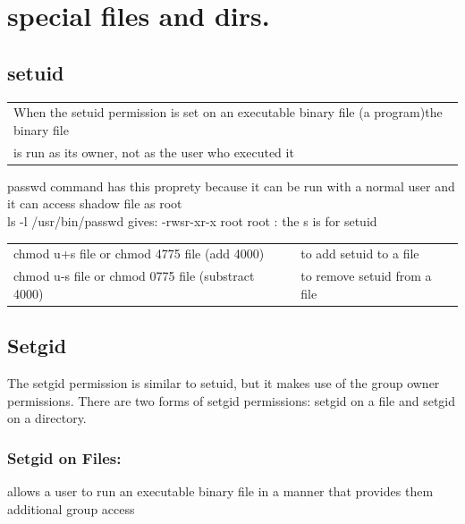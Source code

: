 \documentclass[10pt]{article}
\begin{document}
\section{special files and dirs.}
\subsection{setuid}
\begin{center}
	\begin{tabular}{|l|}
		\hline
		When the setuid permission is set on an executable binary file (a program)the binary file \\is run as its owner, not as the user who executed it\\
		\hline
	\end{tabular}
\end{center}
passwd command has this proprety because it can be run with a normal user and it can access shadow file as root\\
ls -l /usr/bin/passwd gives: -rwsr-xr-x root root : the s is for setuid\\
\begin{center}
	\begin{tabular}{l l}
		chmod u+s file or chmod 4775 file (add 4000)& to add setuid to a file\\
		chmod u-s file or chmod 0775 file (substract 4000)& to remove setuid from a file\\
	\end{tabular}
\end{center}
\subsection{Setgid}
The setgid permission is similar to setuid, but it makes use of the group owner permissions. There are two forms of setgid
permissions: setgid on a file and setgid on a directory.\\
\subsubsection{Setgid on Files:}
allows a user to run an executable binary file in a manner that provides them additional group access
\end{document}
